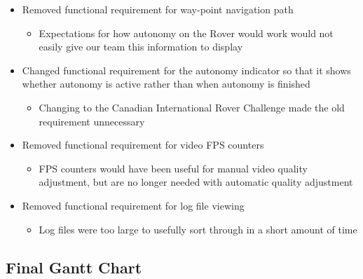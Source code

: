 \begin{itemize}
\item Removed functional requirement for way-point navigation path
	\begin{itemize}
	\item Expectations for how autonomy on the Rover would work would not easily give our team this information to display
	\end{itemize}
    
\item Changed functional requirement for the autonomy indicator so that it shows whether autonomy is active rather than when autonomy is finished
	\begin{itemize}
	\item Changing to the Canadian International Rover Challenge made the old requirement unnecessary
	\end{itemize}
    
\item Removed functional requirement for video FPS counters
	\begin{itemize}
	\item FPS counters would have been useful for manual video quality adjustment, but are no longer needed with automatic quality adjustment
	\end{itemize}
    
\item Removed functional requirement for log file viewing
	\begin{itemize}
	\item Log files were too large to usefully sort through in a short amount of time
	\end{itemize}
    
\end{itemize}

\subsection{Final Gantt Chart}
